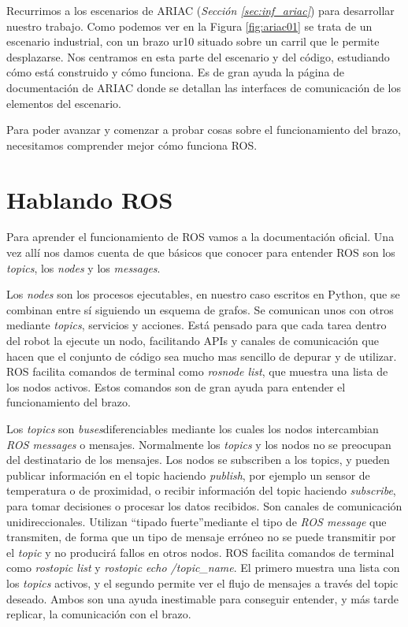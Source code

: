 Recurrimos a los escenarios de ARIAC (\textit{Sección \ref{sec:inf_ariac}}) para desarrollar nuestro trabajo. Como podemos ver en la Figura \ref{fig:ariac01} se trata de un escenario industrial, con un brazo ur10 situado sobre un carril que le permite desplazarse. Nos centramos en esta parte del escenario y del código, estudiando cómo está construido y cómo funciona. Es de gran ayuda la página de documentación de ARIAC\cite{ariacwiki} donde se detallan las interfaces de comunicación de los elementos del escenario.

Para poder avanzar y comenzar a probar cosas sobre el funcionamiento del brazo, necesitamos comprender mejor cómo funciona ROS. 

\section{Hablando ROS}
\label{sec:br_hablandoros}

Para aprender el funcionamiento de ROS vamos a la documentación oficial\cite{roswiki}. Una vez allí nos damos cuenta de que básicos que conocer para entender ROS son los \textit{topics}, los \textit{nodes} y  los \textit{messages}. 

Los \textit{nodes} son los procesos ejecutables, en nuestro caso escritos en Python, que se combinan entre sí siguiendo un esquema de grafos. Se comunican unos con otros mediante \textit{topics}, servicios y acciones. Está pensado para que cada tarea dentro del robot la ejecute un nodo, facilitando APIs y canales de comunicación que hacen que el conjunto de código sea mucho mas sencillo de depurar y de utilizar. ROS facilita comandos de terminal como \textit{rosnode list}, que muestra una lista de los nodos activos. Estos comandos son de gran ayuda para entender el funcionamiento del brazo.

Los \textit{topics} son \textit{buses}diferenciables mediante los cuales los nodos intercambian \textit{ROS messages} o mensajes. Normalmente los \textit{topics} y los nodos no se preocupan del destinatario de los mensajes. Los nodos se subscriben a los topics, y pueden publicar información en el topic haciendo \textit{publish}, por ejemplo un sensor de temperatura o de proximidad, o recibir información del topic haciendo \textit{subscribe}, para tomar decisiones o procesar los datos recibidos. Son canales de comunicación unidireccionales. Utilizan \textquotedblleft tipado fuerte\textquotedblright  mediante el tipo de \textit{ROS message} que transmiten, de forma que un tipo de mensaje erróneo no se puede transmitir por el \textit{topic} y no producirá fallos en otros nodos. ROS facilita comandos de terminal como \textit{rostopic list} y \textit{rostopic echo /topic\_name}. El primero muestra una lista con los \textit{topics} activos, y el segundo permite ver el flujo de mensajes a través del topic deseado. Ambos son una ayuda inestimable para conseguir entender, y más tarde replicar, la comunicación con el brazo.

